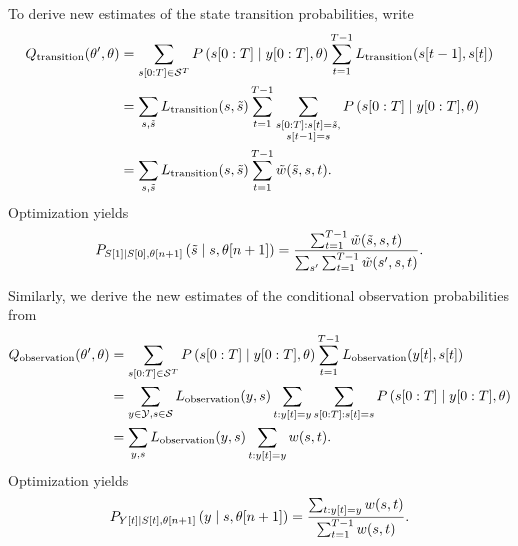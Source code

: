 To derive new estimates of the state transition probabilities, write
\begin{align}
  Q_{\text{transition}} (\parameters',\parameters) &=
  \sum_{\ts{s}{0}{T}\in\states^T} P
  \left(\ts{s}{0}{T}\given \ts{y}{0}{T},\parameters \right) \sum_{t=1}^{T-1}
  L_{\text{transition}}(\ti{s}{t-1},\ti{s}{t})\\
  &= \sum_{s,{\tilde s}} L_{\text{transition}}(s,{\tilde s})
  \sum_{t=1}^{T-1} \sum_{\substack{\ts{s}{0}{T}:\ti{s}{t}={\tilde
        s},\\\ti{s}{t-1}=s}}
  P\left(\ts{s}{0}{T}\given \ts{y}{0}{T},\parameters \right)\\
  &= \sum_{s,{\tilde s}} L_{\text{transition}}(s,{\tilde s})
  \sum_{t=1}^{T-1} {\tilde w}({\tilde s},s,t).
\end{align}
Optimization yields
\begin{equation}
  \label{eq:NewTrans}
  P_{{S}{[1]}\mid {S}{[0]},{\theta}{[n+1]}} \left({\tilde
      s}\mid s,{\theta}{[n+1]} \right) = \frac
  {\sum_{t=1}^{T-1} {\tilde w}({\tilde s},s,t)} {\sum_{s'}
    \sum_{t=1}^{T-1} {\tilde w}(s',s,t)}.
\end{equation}

Similarly, we derive the new estimates of the conditional observation
probabilities from
\begin{align}
  \label{eq:Qout1}
  Q_{\text{observation}} (\parameters',\parameters) &=
  \sum_{\ts{s}{0}{T}\in\states^T} P
  \left(\ts{s}{0}{T}\given \ts{y}{0}{T},\parameters \right) \sum_{t=1}^{T-1}
  L_{\text{observation}}(\ti{y}{t},\ti{s}{t})\\
  &= \sum_{y\in\outputs,s\in\states} L_{\text{observation}}(y,s)
  \sum_{t:\ti{y}{t}=y}
  \sum_{\ts{s}{0}{T}:\ti{s}{t}=s }P
  \left(\ts{s}{0}{T}\given \ts{y}{0}{T},\parameters \right) \\
  &= \sum_{y,s} L_{\text{observation}}(y,s) \sum_{t:\ti{y}{t}=y} w(s,t).
\end{align}
Optimization yields
\begin{equation}
  \label{eq:NewOut}
  P_{{Y}{[t]}\mid {S}{[t]},{\theta}{[n+1]}}
  \left(y\mid s,{\theta}{[n+1]} \right) = \frac
  {\sum_{t:{y}{[t]}=y} w(s,t)} {\sum_{t=1}^{T-1} w(s,t)}.
\end{equation}

